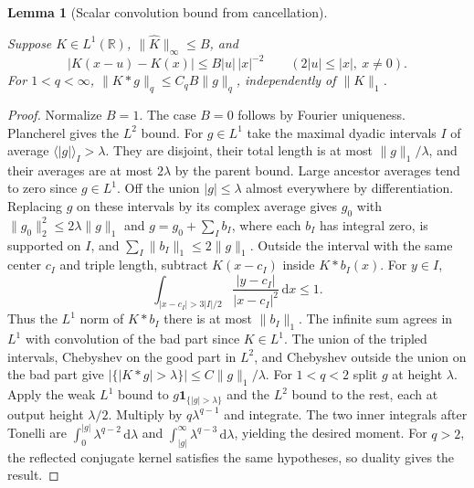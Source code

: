 \documentclass[11pt,letterpaper]{article}
\newtheorem{lemma}[theorem]{Lemma}
\theoremstyle{definition}
\newcommand{\R}{\mathbb R}
\newcommand{\ind}{\mathbf1}
\newcommand{\dd}{\,\mathrm d}
\providecommand{\lean}[1]{}
\providecommand{\uses}[1]{}
\begin{document}
\begin{lemma}[Scalar convolution bound from cancellation]
\label{bp:scalar-cz}
\lean{TwistedParaproduct.scalarCz}
Suppose \(K\in L^1(\R)\), \(\|\widehat K\|_\infty\le B\), and
\[
 |K(x-u)-K(x)|\le B|u|\,|x|^{-2}\qquad(2|u|\le |x|,\ x\ne0).
\]
For \(1<q<\infty\), \(\|K*g\|_q\le C_q B\|g\|_q\),
independently of \(\|K\|_1\).
\end{lemma}
\begin{proof}
\uses{bp:dyadic-max}
Normalize \(B=1\). The case \(B=0\) follows by Fourier uniqueness.
Plancherel gives the \(L^2\) bound. For \(g\in L^1\) take the maximal
dyadic intervals \(I\) of average \(\langle |g|\rangle_I>\lambda\).
They are disjoint, their total length is at most \(\|g\|_1/\lambda\),
and their averages are at most \(2\lambda\) by the parent bound.
Large ancestor averages tend to zero since \(g\in L^1\). Off the union
\(|g|\le\lambda\) almost everywhere by differentiation. Replacing \(g\)
on these intervals by its complex average gives \(g_0\) with
\(\|g_0\|_2^2\le 2\lambda\|g\|_1\) and
\(g=g_0+\sum_I b_I\), where each \(b_I\) has integral zero, is
supported on \(I\), and \(\sum_I\|b_I\|_1\le2\|g\|_1\).
Outside the interval with the same center \(c_I\) and triple length,
subtract \(K(x-c_I)\) inside \(K*b_I(x)\). For \(y\in I\),
\[
 \int_{|x-c_I|>3|I|/2}
 \frac{|y-c_I|}{|x-c_I|^2}\dd x\le1 .
\]
Thus the \(L^1\) norm of \(K*b_I\) there is at most \(\|b_I\|_1\).
The infinite sum agrees in \(L^1\) with convolution of the bad part
since \(K\in L^1\). The union of the tripled intervals, Chebyshev on
the good part in \(L^2\), and Chebyshev outside the union on the bad
part give \(|\{|K*g|>\lambda\}|\le C\|g\|_1/\lambda\).
For \(1<q<2\) split \(g\) at height \(\lambda\). Apply the weak
\(L^1\) bound to \(g\ind_{\{|g|>\lambda\}}\) and the \(L^2\) bound
to the rest, each at output height \(\lambda/2\). Multiply by
\(q\lambda^{q-1}\) and integrate. The two inner integrals after
Tonelli are \(\int_0^{|g|}\lambda^{q-2}\dd\lambda\) and
\(\int_{|g|}^\infty\lambda^{q-3}\dd\lambda\), yielding the desired
moment. For \(q>2\), the reflected conjugate kernel satisfies the
same hypotheses, so duality gives the result.
\end{proof}
\end{document}
